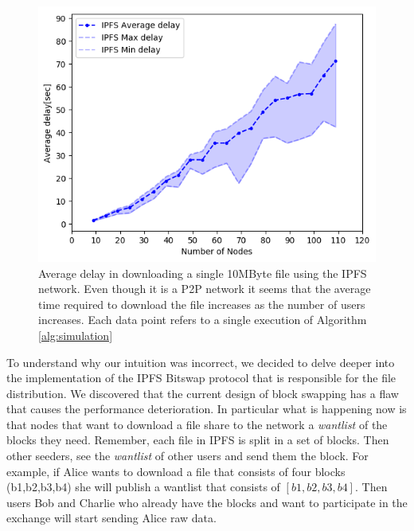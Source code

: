 {{{\begin{figure}[!htb]
\centering
\includegraphics[width=\textwidth]{./results/ipfs-perf.png}
\caption{Average delay in downloading a single 10MByte file using the IPFS network. Even though it is a P2P network it seems that the average time required to download the file increases as the number of users increases. Each data point refers to a single execution of Algorithm \ref{alg:simulation}}
\label{fig:IPFSPerf}
\end{figure}

To understand why our intuition was incorrect, we decided to delve deeper into the implementation of the IPFS Bitswap protocol that is responsible for the file distribution. We discovered that the current design of block swapping has a flaw that causes the performance deterioration. In particular what is happening now is that nodes that want to download a file share to the network a \textit{wantlist} of the blocks they need. Remember, each file in IPFS is split in a set of blocks. Then other seeders, see the \textit{wantlist} of other users and send them the block. For example, if Alice wants to download a file that consists of four blocks (b1,b2,b3,b4) she will publish a wantlist that consists of $[b1,b2,b3,b4]$. Then users Bob and Charlie who already have the blocks and want to participate in the exchange will start sending Alice raw data.

}}}
